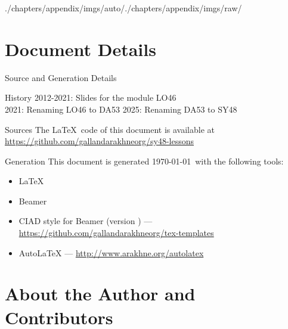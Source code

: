 \begin{graphicspathcontext}{{./chapters/appendix/imgs/auto/}{./chapters/appendix/imgs/raw/}}
\section{Document Details}
\sectiontableofcontentslide

\begin{frame}[t]{Source and Generation Details}
	\begin{smaller}
		\begin{block}{History}
			2012-2021: Slides for the module LO46 \\
			2021: Renaming LO46 to DA53
			2025: Renaming DA53 to SY48
		\end{block}
		\vspace{.25cm}
		\begin{block}{Sources}
			The \LaTeX\ code of this document is available at \url{https://github.com/gallandarakhneorg/sy48-lessons}
		\end{block}
		\vspace{.25cm}
		\begin{block}{Generation}
			This document is generated \today\ with the following tools:
			\begin{itemize}
			\item \LaTeX
			\item Beamer
			\item CIAD style for Beamer (version \insertciadbeamerthemeversion) --- \url{https://github.com/gallandarakhneorg/tex-templates}
			\item AutoLaTeX --- \url{http://www.arakhne.org/autolatex}
			\end{itemize}
		\end{block}
	\end{smaller}
\end{frame}

\section{About the Author and Contributors}
\sectiontableofcontentslide


\end{graphicspathcontext}
